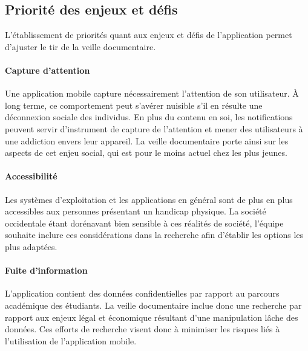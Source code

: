 	\subsection{Priorité des enjeux et défis}
	L'établissement de priorités quant aux enjeux et défis de l'application permet d'ajuster le tir de la veille documentaire.
	
	\paragraph{Capture d'attention} Une application mobile capture nécessairement l'attention de son utilisateur. À long terme, ce comportement peut s'avérer nuisible s'il en résulte une déconnexion sociale des individus. En plus du contenu en soi, les notifications peuvent servir d'instrument de capture de l'attention et mener des utilisateurs à une addiction envers leur appareil. La veille documentaire porte ainsi sur les aspects de cet enjeu social, qui est pour le moins actuel chez les plus jeunes.
	
	\paragraph{Accessibilité} Les systèmes d'exploitation et les applications en général sont de plus en plus accessibles aux personnes présentant un handicap physique. La société occidentale étant dorénavant bien sensible à ces réalités de société, l'équipe souhaite inclure ces considérations dans la recherche afin d'établir les options les plus adaptées.
	
	\paragraph{Fuite d'information} L'application contient des données confidentielles par rapport au parcours académique des étudiants. La veille documentaire inclue donc une recherche par rapport aux enjeux légal et économique résultant d'une manipulation lâche des données. Ces efforts de recherche visent donc à minimiser les risques liés à l'utilisation de l'application mobile.
	
	
	
	
	
	
	
	
	
	
	
	
	
	
